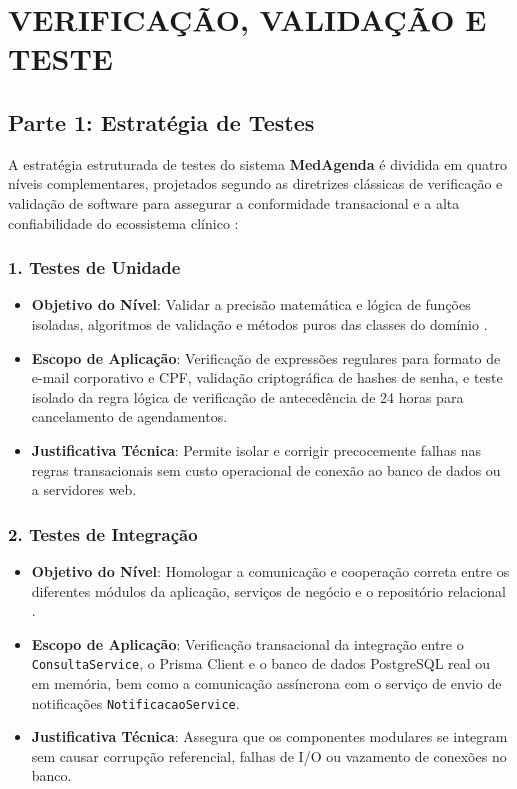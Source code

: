 \section{VERIFICAÇÃO, VALIDAÇÃO E TESTE}

\subsection{Parte 1: Estratégia de Testes}

A estratégia estruturada de testes do sistema \textbf{MedAgenda} é dividida em quatro níveis complementares, projetados segundo as diretrizes clássicas de verificação e validação de software para assegurar a conformidade transacional e a alta confiabilidade do ecossistema clínico \cite{myers2011, beizer1995}:

\subsubsection{1. Testes de Unidade}
\begin{itemize}
    \item \textbf{Objetivo do Nível}: Validar a precisão matemática e lógica de funções isoladas, algoritmos de validação e métodos puros das classes do domínio \cite{myers2011}.
    \item \textbf{Escopo de Aplicação}: Verificação de expressões regulares para formato de e-mail corporativo e CPF, validação criptográfica de hashes de senha, e teste isolado da regra lógica de verificação de antecedência de 24 horas para cancelamento de agendamentos.
    \item \textbf{Justificativa Técnica}: Permite isolar e corrigir precocemente falhas nas regras transacionais sem custo operacional de conexão ao banco de dados ou a servidores web.
\end{itemize}

\subsubsection{2. Testes de Integração}
\begin{itemize}
    \item \textbf{Objetivo do Nível}: Homologar a comunicação e cooperação correta entre os diferentes módulos da aplicação, serviços de negócio e o repositório relacional \cite{beizer1995}.
    \item \textbf{Escopo de Aplicação}: Verificação transacional da integração entre o \texttt{ConsultaService}, o Prisma Client e o banco de dados PostgreSQL real ou em memória, bem como a comunicação assíncrona com o serviço de envio de notificações \texttt{NotificacaoService}.
    \item \textbf{Justificativa Técnica}: Assegura que os componentes modulares se integram sem causar corrupção referencial, falhas de I/O ou vazamento de conexões no banco.
\end{itemize}

